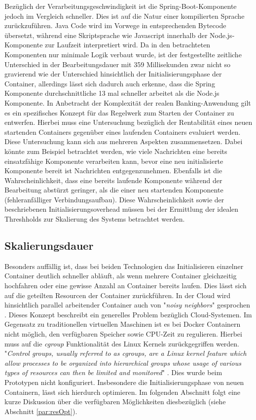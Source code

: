 Bezüglich der Verarbeitungsgeschwindigkeit ist die Spring-Boot-Komponente jedoch im Vergleich schneller. Dies ist auf die Natur einer kompilierten Sprache zurückzuführen. Java Code wird im Vorwege in entsprechenden Bytecode übersetzt, während eine Skriptsprache wie Javascript innerhalb der Node.js-Komponente zur Laufzeit interpretiert wird. Da in den betrachteten Komponenten nur minimale Logik verbaut wurde, ist der festgestellte zeitliche Unterschied in der Bearbeitungsdauer mit 359  Millisekunden zwar nicht so gravierend wie der Unterschied hinsichtlich der Initialisierungsphase der Container, allerdings lässt sich dadurch auch erkenne, dass die Spring Komponente durchschnittliche 13 mal schneller arbeitet als die Node.js Komponente. In Anbetracht der Komplexität der realen Banking-Anwendung gilt es ein spezifisches Konzept für das Regelwerk zum Starten der Container zu entwerfen. Hierbei muss eine Untersuchung bezüglich der Rentabilität eines neuen startenden Containers gegenüber eines laufenden Containers evaluiert werden. Diese Untersuchung kann sich aus mehreren Aspekten zusammensetzen. Dabei könnte zum Beispiel betrachtet werden, wie viele Nachrichten eine bereits einsatzfähige Komponente verarbeiten kann, bevor eine neu initialisierte Komponente bereit ist Nachrichten entgegenzunehmen. Ebenfalls ist die Wahrscheinlichkeit, dass eine bereits laufende Komponente während der Bearbeitung abstürzt geringer, als die einer neu startenden Komponente (fehleranfälliger Verbindungsaufbau). Diese Wahrscheinlichkeit sowie der beschriebenen Initialisierungsoverhead müssen bei der Ermittlung der idealen Threshholds zur Skalierung des Systems betrachtet werden. 


\subsection{Skalierungsdauer}
\label{ss:skalierungsdauer}
Besonders auffällig ist, dass bei beiden Technologien das Initialisieren einzelner Container deutlich schneller abläuft, als wenn mehrere Container gleichzeitig hochfahren oder eine gewisse Anzahl an Container bereits laufen. Dies lässt sich auf die geteilten Resourcen der Container zurückführen. In der Cloud wird hinsichtlich parallel arbeitender Container auch von "\emph{noisy neighbors}" gesprochen \cite[Seite~67 ff.]{oreilly-docker}. Dieses Konzept beschreibt ein generelles Problem bezüglich Cloud-Systemen. Im Gegensatz zu traditionellen virtuellen Maschinen ist es bei Docker Containern nicht möglich, den verfügbaren Speicher sowie CPU-Zeit zu regulieren. Hierbei muss auf die \emph{cgroup} Funktionalität des Linux Kernels zurückgegriffen werden. "\emph{Control groups, usually referred to as cgroups, are a Linux kernel feature which allow processes to be organized into hierarchical groups whose usage of various types of resources can then be limited and monitored}" \cite{man-cgroups}. Dies wurde beim Prototypen nicht konfiguriert. Insbesondere die Initialisierungsphase von neuen Containern, lässt sich hierdurch optimieren. Im folgenden Abschnitt folgt eine kurze Diskussion über die verfügbaren Möglichkeiten diesbezüglich (siehe Abschnitt \ref{par:resOpt}).

